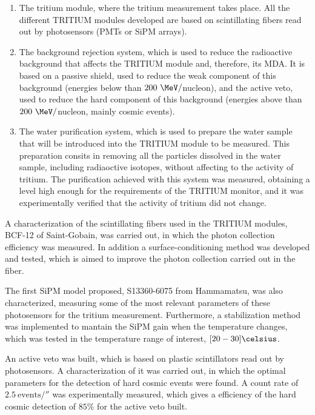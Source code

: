 \begin{enumerate}

\item{} The tritium module, where the tritium measurement takes place. All the different TRITIUM modules developed are based on scintillating fibers read out by photosensors (PMTs or SiPM arrays).

\item{} The background rejection system, which is used to reduce the radioactive background that affects the TRITIUM module and, therefore, its MDA. It is based on a passive shield, used to reduce the weak component of this background (energies below than $200~\MeV/$nucleon), and the active veto, used to reduce the hard component of this background (energies above than $200~\MeV/$nucleon, mainly cosmic events).

\item{} The water purification system, which is used to prepare the water sample that will be introduced into the TRITIUM module to be measured. This preparation consits in removing all the particles dissolved in the water sample, including radiaoctive isotopes, without affecting to the activity of tritium. The purification achieved with this system was measured, obtaining a level high enough for the requirements of the TRITIUM monitor, and it was experimentally verified that the activity of tritium did not change.

\end{enumerate} 

A characterization of the scintillating fibers used in the TRITIUM modules, BCF-12 of Saint-Gobain, was carried out, in which the photon collection efficiency was measured. In addition a surface-conditioning method was developed and tested, which is aimed to improve the photon collection carried out in the fiber.

The first SiPM model proposed, S13360-6075 from Hammamatsu, was also characterized, measuring some of the most relevant parameters of these photosensors for the tritium measurement. Furthermore, a stabilization method was implemented to mantain the SiPM gain when the temperature changes, which was tested in the temperature range of interest, $[20-30]\celsius$.

An active veto was built, which is based on plastic scintillators read out by photosensors. A characterization of it was carried out, in which the optimal parameters for the detection of hard cosmic events were found. A count rate of $2.5~\text{events}/\second$ was experimentally measured, which gives a efficiency of the hard cosmic detection of $85\%$ for the active veto built.

